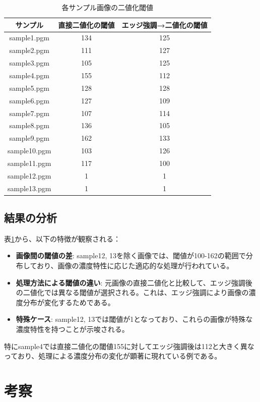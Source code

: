 \documentclass[a4paper,12pt]{jsarticle}
\begin{document}
\begin{table}[htbp]
\centering
\caption{各サンプル画像の二値化閾値}
\label{tab:thresholds}
\begin{tabular}{|c|c|c|}
\hline
サンプル & 直接二値化の閾値 & エッジ強調→二値化の閾値 \\
\hline
sample1.pgm & 134 & 125 \\
sample2.pgm & 111 & 127 \\
sample3.pgm & 105 & 125 \\
sample4.pgm & 155 & 112 \\
sample5.pgm & 128 & 128 \\
sample6.pgm & 127 & 109 \\
sample7.pgm & 107 & 114 \\
sample8.pgm & 136 & 105 \\
sample9.pgm & 162 & 133 \\
sample10.pgm & 103 & 126 \\
sample11.pgm & 117 & 100 \\
sample12.pgm & 1 & 1 \\
sample13.pgm & 1 & 1 \\
\hline
\end{tabular}
\end{table}

\subsection{結果の分析}

表\ref{tab:thresholds}から、以下の特徴が観察される：

\begin{itemize}
\item \textbf{画像間の閾値の差}: sample12, 13を除く画像では、閾値が100-162の範囲で分布しており、画像の濃度特性に応じた適応的な処理が行われている。
\item \textbf{処理方法による閾値の違い}: 元画像の直接二値化と比較して、エッジ強調後の二値化では異なる閾値が選択される。これは、エッジ強調により画像の濃度分布が変化するためである。
\item \textbf{特殊ケース}: sample12, 13では閾値が1となっており、これらの画像が特殊な濃度特性を持つことが示唆される。
\end{itemize}

特にsample4では直接二値化の閾値155に対してエッジ強調後は112と大きく異なっており、処理による濃度分布の変化が顕著に現れている例である。

\section{考察}
\end{document}
